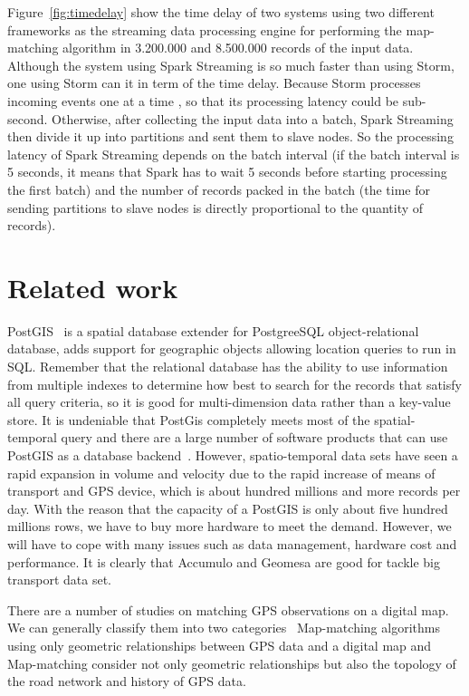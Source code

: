 \documentclass{acm_proc_article-sp}
\begin{document}
Figure~\ref{fig:timedelay} show the time delay of two systems using two different frameworks as the streaming data processing engine for performing the map-matching algorithm in 3.200.000 and 8.500.000 records of the input data. Although the system using Spark Streaming is so much faster than using Storm, one using Storm can it in term of the time delay. Because Storm processes incoming events one at a time , so that its processing latency could be sub-second. Otherwise, after collecting the input data into a batch, Spark Streaming then divide it up into partitions and sent them to slave nodes. So the processing latency of Spark Streaming depends on the batch interval (if the batch interval is 5 seconds, it means that Spark has to wait 5 seconds before starting processing the first batch)  and the number of records packed in the batch (the time for sending partitions to slave nodes is directly proportional to the quantity of records).


\section{Related work}

PostGIS~\cite{posgis} is a spatial database extender for PostgreeSQL object-relational database, adds support for geographic objects allowing location queries to run in SQL. Remember that the relational database has the ability to use information from multiple indexes to determine how best to search for the records that satisfy all query criteria, so it is good for multi-dimension data rather than a key-value store. It is undeniable that PostGis completely meets most of the spatial-temporal query and there are a large number of software products that can use PostGIS as a database backend~\cite{backendposgis}. However, spatio-temporal data sets have seen a rapid expansion in volume and velocity due to the rapid increase of means of transport and GPS device, which is about hundred millions and more records per day. With the reason that the capacity of a PostGIS is only about five hundred millions rows, we have to buy more hardware to meet the demand. However, we will have to cope with many issues such as data management, hardware cost and performance. It is clearly that Accumulo and Geomesa are good for tackle big transport data set.

There are a number of studies on matching GPS observations on a digital map. We can generally classify them into two categories~\cite{yang2005map} Map-matching algorithms using only geometric relationships between GPS data and a digital map and Map-matching consider not only geometric relationships but also the topology of the road network and history of GPS data.
		
\end{document}
